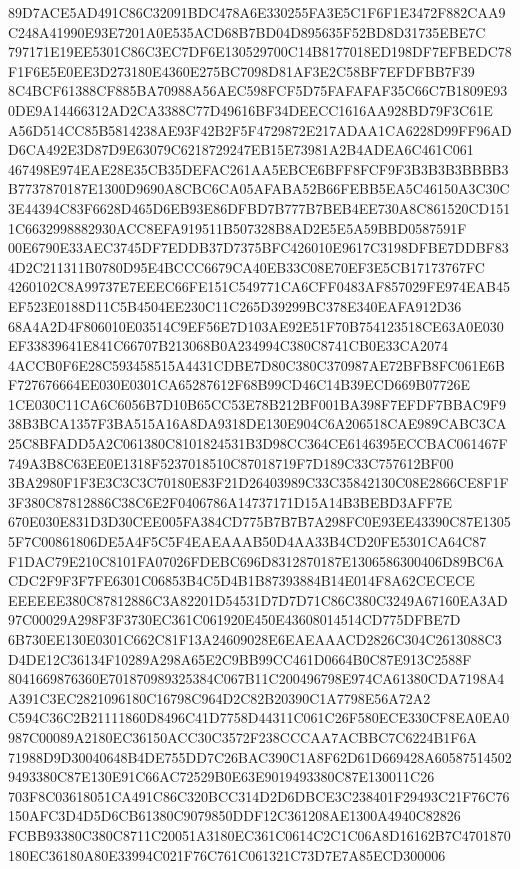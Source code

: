 \documentclass[UTF8,fontset=fandol,zihao=-4,a4paper]{ctexart}
\begin{document}
{{89D7ACE5AD491C86C32091BDC478A6E330255FA3E5C1F6F1E3472F882CAA9C248A41990E93E7201A0E535ACD68B7BD04D895635F52BD8D31735EBE7C
797171E19EE5301C86C3EC7DF6E130529700C14B8177018ED198DF7EFBEDC78F1F6E5E0EE3D273180E4360E275BC7098D81AF3E2C58BF7EFDFBB7F39
8C4BCF61388CF885BA70988A56AEC598FCF5D75FAFAFAF35C66C7B1809E930DE9A14466312AD2CA3388C77D49616BF34DEECC1616AA928BD79F3C61E
A56D514CC85B5814238AE93F42B2F5F4729872E217ADAA1CA6228D99FF96ADD6CA492E3D87D9E63079C6218729247EB15E73981A2B4ADEA6C461C061
467498E974EAE28E35CB35DEFAC261AA5EBCE6BFF8FCF9F3B3B3B3BBBB3B7737870187E1300D9690A8CBC6CA05AFABA52B66FEBB5EA5C46150A3C30C
3E44394C83F6628D465D6EB93E86DFBD7B777B7BEB4EE730A8C861520CD1511C6632998882930ACC8EFA919511B507328B8AD2E5E5A59BBD0587591F
00E6790E33AEC3745DF7EDDB37D7375BFC426010E9617C3198DFBE7DDBF834D2C211311B0780D95E4BCCC6679CA40EB33C08E70EF3E5CB17173767FC
4260102C8A99737E7EEEC66FE151C549771CA6CFF0483AF857029FE974EAB45EF523E0188D11C5B4504EE230C11C265D39299BC378E340EAFA912D36
68A4A2D4F806010E03514C9EF56E7D103AE92E51F70B754123518CE63A0E030EF33839641E841C66707B213068B0A234994C380C8741CB0E33CA2074
4ACCB0F6E28C593458515A4431CDBE7D80C380C370987AE72BFB8FC061E6BF727676664EE030E0301CA65287612F68B99CD46C14B39ECD669B07726E
1CE030C11CA6C6056B7D10B65CC53E78B212BF001BA398F7EFDF7BBAC9F938B3BCA1357F3BA515A16A8DA9318DE130E904C6A206518CAE989CABC3CA
25C8BFADD5A2C061380C8101824531B3D98CC364CE6146395ECCBAC061467F749A3B8C63EE0E1318F5237018510C87018719F7D189C33C757612BF00
3BA2980F1F3E3C3C3C70180E83F21D26403989C33C35842130C08E2866CE8F1F3F380C87812886C38C6E2F0406786A14737171D15A14B3BEBD3AFF7E
670E030E831D3D30CEE005FA384CD775B7B7B7A298FC0E93EE43390C87E13055F7C00861806DE5A4F5C5F4EAEAAAB50D4AA33B4CD20FE5301CA64C87
F1DAC79E210C8101FA07026FDEBC696D8312870187E1306586300406D89BC6ACDC2F9F3F7FE6301C06853B4C5D4B1B87393884B14E014F8A62CECECE
EEEEEE380C87812886C3A82201D54531D7D7D71C86C380C3249A67160EA3AD97C00029A298F3F3730EC361C061920E450E43608014514CD775DFBE7D
6B730EE130E0301C662C81F13A24609028E6EAEAAACD2826C304C2613088C3D4DE12C36134F10289A298A65E2C9BB99CC461D0664B0C87E913C2588F
8041669876360E701870989325384C067B11C200496798E974CA61380CDA7198A4A391C3EC2821096180C16798C964D2C82B20390C1A7798E56A72A2
C594C36C2B21111860D8496C41D7758D44311C061C26F580ECE330CF8EA0EA0987C00089A2180EC36150ACC30C3572F238CCCAA7ACBBC7C6224B1F6A
71988D9D30040648B4DE755DD7C26BAC390C1A8F62D61D669428A605875145029493380C87E130E91C66AC72529B0E63E9019493380C87E130011C26
703F8C03618051CA491C86C320BCC314D2D6DBCE3C238401F29493C21F76C76150AFC3D4D5D6CB61380C9079850DDF12C361208AE1300A4940C82826
FCBB93380C380C8711C20051A3180EC361C0614C2C1C06A8D16162B7C4701870180EC36180A80E33994C021F76C761C061321C73D7E7A85ECD300006
}}
\end{document}
